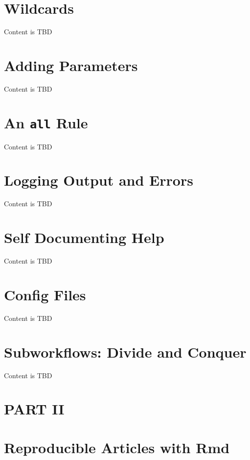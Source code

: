 \documentclass[]{book}
\theoremstyle{definition}
\theoremstyle{definition}
\theoremstyle{definition}
\theoremstyle{remark}
\begin{document}
\chapter{Wildcards}\label{wildcards}

Content is TBD

\chapter{Adding Parameters}\label{adding-parameters}

Content is TBD

\chapter{\texorpdfstring{An \texttt{all}
Rule}{An all Rule}}\label{an-all-rule}

Content is TBD

\chapter{Logging Output and Errors}\label{logging-output-and-errors}

Content is TBD

\chapter{Self Documenting Help}\label{self-documenting-help}

Content is TBD

\chapter{Config Files}\label{config-files}

Content is TBD

\chapter{Subworkflows: Divide and
Conquer}\label{subworkflows-divide-and-conquer}

Content is TBD

\chapter*{PART II}\label{part-ii}

\chapter{Reproducible Articles with
Rmd}\label{reproducible-articles-with-rmd}
\end{document}
